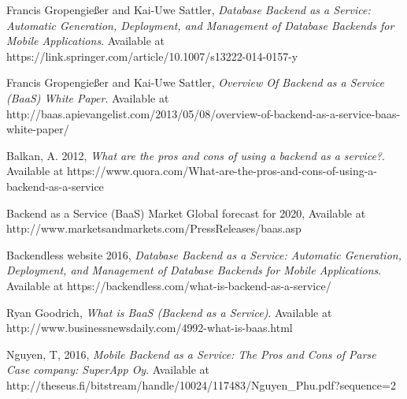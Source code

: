 \documentclass[a4paper]{article}
\begin{document}
    \begin{thebibliography}{9}
    	Francis Gropengießer and Kai-Uwe Sattler,
      \emph{Database Backend as a Service: Automatic Generation, Deployment, and Management of Database Backends for Mobile Applications}.
			Available at https://link.springer.com/article/10.1007/s13222-014-0157-y
			
    	Francis Gropengießer and Kai-Uwe Sattler,
      \emph{Overview Of Backend as a Service (BaaS) White Paper}.
			Available at http://baas.apievangelist.com/2013/05/08/overview-of-backend-as-a-service-baas-white-paper/
			
						
		
			Balkan, A. 2012,
      \emph{What are the pros and cons of using a backend as a service?}.
			Available at https://www.quora.com/What-are-the-pros-and-cons-of-using-a-backend-as-a-service			
		
			Backend as a Service (BaaS) Market Global forecast for 2020,
			Available at http://www.marketsandmarkets.com/PressReleases/baas.asp		
		
			Backendless website 2016,
      \emph{Database Backend as a Service: Automatic Generation, Deployment, and Management of Database Backends for Mobile Applications}.
			Available at https://backendless.com/what-is-backend-as-a-service/
	

			Ryan Goodrich,
      \emph{What is BaaS (Backend as a Service)}.
			Available at http://www.businessnewsdaily.com/4992-what-is-baas.html	
			
			Nguyen, T, 2016,
      \emph{Mobile Backend as a Service: The Pros and Cons of Parse
			Case company: SuperApp Oy}.
			Available at http://theseus.fi/bitstream/handle/10024/117483/Nguyen_Phu.pdf?sequence=2	
		
		
		\end{thebibliography}
    
\end{document}
